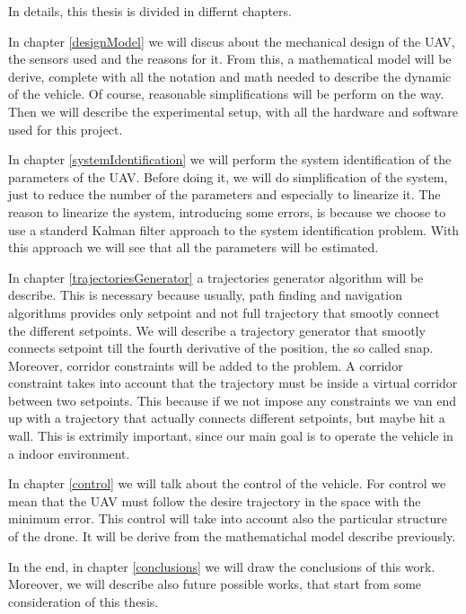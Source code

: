 \noindent In details, this thesis is divided in differnt chapters.

\noindent In chapter \ref{designModel} we will discus about the mechanical design of the UAV, the sensors used and the reasons for it. From this, a mathematical model will be derive, complete with all the notation and math needed to describe the dynamic of the vehicle. Of course, reasonable simplifications will be perform on the way. Then we will describe the experimental setup, with all the hardware and software used for this project.

\noindent In chapter \ref{systemIdentification} we will perform the system identification of the parameters of the UAV. Before doing it, we will do simplification of the system, just to reduce the number of the parameters and especially to linearize it. The reason to linearize the system, introducing some errors, is because we choose to use a standerd Kalman filter approach to the system identification problem. With this approach we will see that all the parameters will be estimated.

\noindent In chapter \ref{trajectoriesGenerator} a trajectories generator algorithm will be describe. This is necessary because usually, path finding and navigation algorithms provides only setpoint and not full trajectory that smootly connect the different setpoints. We will describe a trajectory generator that smootly connects setpoint till the fourth derivative of the position, the so called snap. Moreover, corridor constraints will be added to the problem. A corridor constraint takes into account that the trajectory must be inside a virtual corridor between two setpoints. This because if we not impose any constraints we van end up with a trajectory that actually connects different setpoints, but maybe hit a wall. This is extrimily important, since our main goal is to operate the vehicle in a indoor environment. 

\noindent In chapter \ref{control} we will talk about the control of the vehicle. For control we mean that the UAV must follow the desire trajectory in the space with the minimum error. This control will take into account also the particular structure of the drone. It will be derive from the mathematichal model describe previously.

\noindent In the end, in chapter \ref{conclusions} we will draw the conclusions of this work. Moreover, we will describe also future possible works, that start from some consideration of this thesis. 